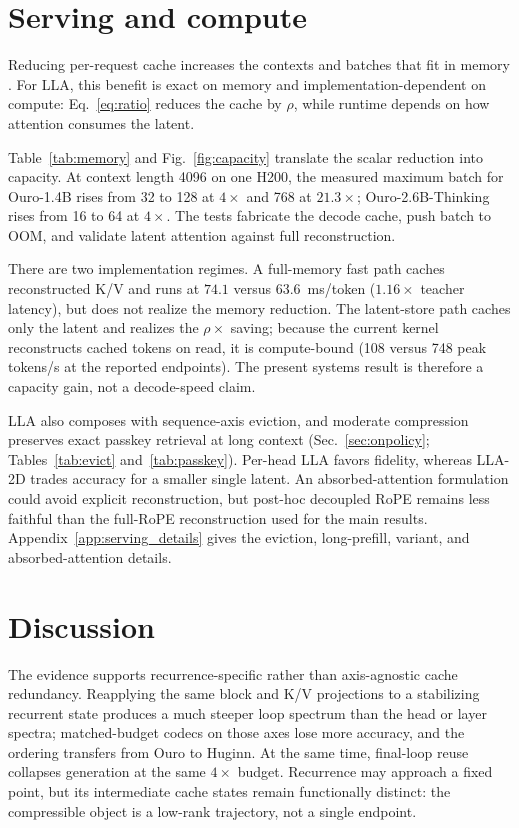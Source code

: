 \documentclass[10pt]{article}
\newcommand{\lla}{LLA}
\begin{document}
\section{Serving and compute}
\label{sec:systems}
Reducing per-request cache increases the contexts and batches that fit in memory \citep{pagedattention2023}. For \lla{}, this benefit is exact on memory and implementation-dependent on compute: Eq.~\eqref{eq:ratio} reduces the cache by $\rho$, while runtime depends on how attention consumes the latent.

\TableMemory
Table~\ref{tab:memory} and Fig.~\ref{fig:capacity} translate the scalar reduction into capacity. At context length 4096 on one H200, the measured maximum batch for Ouro-1.4B rises from 32 to 128 at $4\times$ and 768 at $21.3\times$; Ouro-2.6B-Thinking rises from 16 to 64 at $4\times$. The tests fabricate the decode cache, push batch to OOM, and validate latent attention against full reconstruction.

There are two implementation regimes. A full-memory fast path caches reconstructed K/V and runs at $74.1$ versus $63.6$~ms/token ($1.16\times$ teacher latency), but does not realize the memory reduction. The latent-store path caches only the latent and realizes the $\rho\times$ saving; because the current kernel reconstructs cached tokens on read, it is compute-bound (108 versus 748 peak tokens/s at the reported endpoints). The present systems result is therefore a capacity gain, not a decode-speed claim.

\lla{} also composes with sequence-axis eviction, and moderate compression preserves exact passkey retrieval at long context (Sec.~\ref{sec:onpolicy}; Tables~\ref{tab:evict} and~\ref{tab:passkey}). Per-head \lla{} favors fidelity, whereas \lla{}-2D trades accuracy for a smaller single latent. An absorbed-attention formulation could avoid explicit reconstruction, but post-hoc decoupled RoPE remains less faithful than the full-RoPE reconstruction used for the main results. Appendix~\ref{app:serving_details} gives the eviction, long-prefill, variant, and absorbed-attention details.

\section{Discussion}
\label{sec:discussion}
\vspace{-0.5em}
The evidence supports recurrence-specific rather than axis-agnostic cache redundancy. Reapplying the same block and K/V projections to a stabilizing recurrent state produces a much steeper loop spectrum than the head or layer spectra; matched-budget codecs on those axes lose more accuracy, and the ordering transfers from Ouro to Huginn. At the same time, final-loop reuse collapses generation at the same $4\times$ budget. Recurrence may approach a fixed point, but its intermediate cache states remain functionally distinct: the compressible object is a low-rank trajectory, not a single endpoint.
\end{document}
